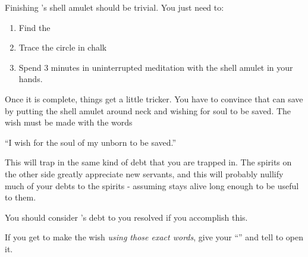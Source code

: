 \documentclass[green]{NeptuneBall}
\begin{document}
\name{\gAmulet{}}

Finishing \cAriel{}'s shell amulet should be trivial. You just need to:
\begin{enumerate}
\item Find the \sRunicCircle{}
\item Trace the circle in chalk
\item Spend 3 minutes in uninterrupted meditation with the shell amulet in your hands. 
\end{enumerate}

Once it is complete, things get a little tricker. You have to convince \cAriel{} that \cAriel{\they} can save \cAriel{\their} \cArielsSon{\offspring} by putting the shell amulet around \cAriel{\their} neck and wishing for \cArielsSon{\their} soul to be saved. The wish must be made with the words

``I wish for the soul of my unborn \cArielsSon{} to be saved.''

This will trap \cAriel{} in the same kind of debt that you are trapped in. The spirits on the other side greatly appreciate new servants, and this will probably nullify much of your debts to the spirits - assuming \cAriel{\they} stays alive long enough to be useful to them. 

You should consider \cAriel{}'s debt to you resolved if you accomplish this.

If you get \cAriel{} to make the wish \emph{using those exact words}, give \cAriel{\them} your ``\mMEnvelope{\MYname}'' and tell \cAriel{\them} to open it.
\end{document}

